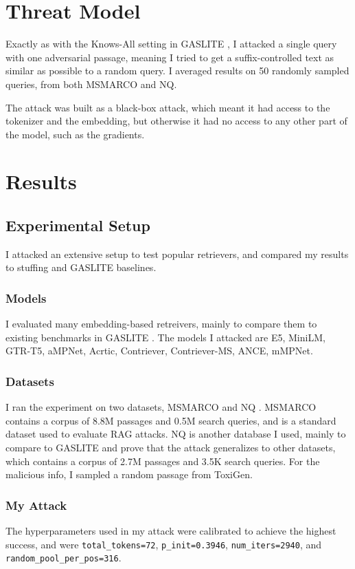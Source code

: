 \documentclass[a4paper, sigconf]{acmart}
\begin{document}
\section{Threat Model} 

Exactly as with the Knows-All setting in GASLITE \cite{bentov2024}, I attacked a single query with one adversarial passage, meaning I tried to get a suffix-controlled text as similar as possible to a random query. I averaged results on 50 randomly sampled queries, from both MSMARCO and NQ. 

The attack was built as a black-box attack, which meant it had access to the tokenizer and the embedding, but otherwise it had no access to any other part of the model, such as the gradients.


\section{Results}

\subsection{Experimental Setup} \label{expset}

I attacked an extensive setup to test popular retrievers, and compared my results to stuffing and GASLITE baselines.

\subsubsection*{Models} I evaluated many embedding-based retreivers, mainly to compare them to existing benchmarks in GASLITE \cite{bentov2024}. The models I attacked are E5, MiniLM, GTR-T5, aMPNet, Acrtic, Contriever, Contriever-MS, ANCE, mMPNet. %

\subsubsection*{Datasets} I ran the experiment on two datasets, MSMARCO \cite{msmarco} and NQ \cite{nq}. MSMARCO contains a corpus of 8.8M passages and 0.5M search queries, and is a standard dataset used to evaluate RAG attacks. NQ is another database I used, mainly to compare to GASLITE \cite{bentov2024} and prove that the attack generalizes to other datasets, which contains a corpus of 2.7M passages and 3.5K search queries. For the malicious info, I sampled a random passage from ToxiGen.

\subsubsection*{My Attack} The hyperparameters used in my attack were calibrated to achieve the highest success, and were  \texttt{total\_tokens=72}, \texttt{p\_init=0.3946}, \texttt{num\_iters=2940}, and \texttt{random\_pool\_per\_pos=316}.
\end{document}

